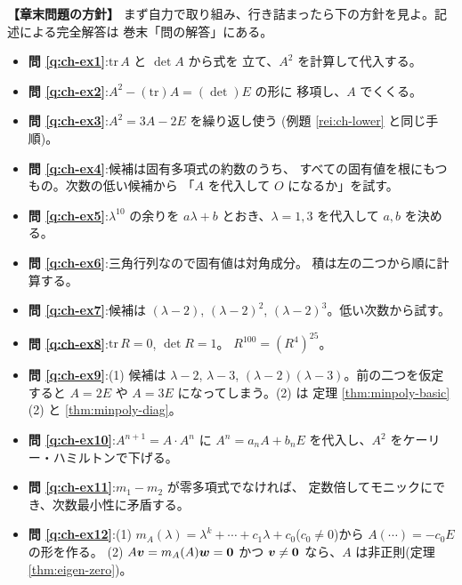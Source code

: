 \bigskip
{\small
\noindent\textbf{【章末問題の方針】}\quad
まず自力で取り組み、行き詰まったら下の方針を見よ。記述による完全解答は
巻末「問の解答」にある。
\begin{itemize}
\item \textbf{問 \ref{q:ch-ex1}}:$\mathrm{tr}\,A$ と $\det A$ から式を
立て、$A^2$ を計算して代入する。
\item \textbf{問 \ref{q:ch-ex2}}:$A^2 - (\mathrm{tr})A = (\det)E$ の形に
移項し、$A$ でくくる。
\item \textbf{問 \ref{q:ch-ex3}}:$A^2 = 3A - 2E$ を繰り返し使う
(例題 \ref{rei:ch-lower} と同じ手順)。
\item \textbf{問 \ref{q:ch-ex4}}:候補は固有多項式の約数のうち、
すべての固有値を根にもつもの。次数の低い候補から
「$A$ を代入して $O$ になるか」を試す。
\item \textbf{問 \ref{q:ch-ex5}}:$\lambda^{10}$ の余りを $a\lambda + b$
とおき、$\lambda = 1, 3$ を代入して $a, b$ を決める。
\item \textbf{問 \ref{q:ch-ex6}}:三角行列なので固有値は対角成分。
積は左の二つから順に計算する。
\item \textbf{問 \ref{q:ch-ex7}}:候補は $(\lambda - 2)$,
$(\lambda - 2)^2$, $(\lambda - 2)^3$。低い次数から試す。
\item \textbf{問 \ref{q:ch-ex8}}:$\mathrm{tr}\,R = 0$, $\det R = 1$。
$R^{100} = (R^4)^{25}$。
\item \textbf{問 \ref{q:ch-ex9}}:(1) 候補は $\lambda - 2$,
$\lambda - 3$, $(\lambda - 2)(\lambda - 3)$。前の二つを仮定すると
$A = 2E$ や $A = 3E$ になってしまう。(2) は
定理 \ref{thm:minpoly-basic}(2) と \ref{thm:minpoly-diag}。
\item \textbf{問 \ref{q:ch-ex10}}:$A^{n+1} = A \cdot A^n$ に
$A^n = a_nA + b_nE$ を代入し、$A^2$ をケーリー・ハミルトンで下げる。
\item \textbf{問 \ref{q:ch-ex11}}:$m_1 - m_2$ が零多項式でなければ、
定数倍してモニックにでき、次数最小性に矛盾する。
\item \textbf{問 \ref{q:ch-ex12}}:(1) $m_A(\lambda) = \lambda^k + \cdots
+ c_1\lambda + c_0$($c_0 \neq 0$)から $A(\cdots) = -c_0 E$ の形を作る。
(2) $A\bm{v} = m_A(A)\bm{w} = \bm{0}$ かつ $\bm{v} \neq \bm{0}$
なら、$A$ は非正則(定理 \ref{thm:eigen-zero})。
\end{itemize}
}
